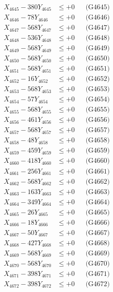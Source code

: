 \documentclass[a4paper,10pt]{article}
\begin{document}
{\begin{align}
X_{4645} - 380Y_{4645} &\leq +0 && \text{(G4645)} \\
X_{4646} - 78Y_{4646} &\leq +0 && \text{(G4646)} \\
X_{4647} - 568Y_{4647} &\leq +0 && \text{(G4647)} \\
X_{4648} - 536Y_{4648} &\leq +0 && \text{(G4648)} \\
X_{4649} - 568Y_{4649} &\leq +0 && \text{(G4649)} \\
X_{4650} - 568Y_{4650} &\leq +0 && \text{(G4650)} \\
\allowbreak
X_{4651} - 568Y_{4651} &\leq +0 && \text{(G4651)} \\
X_{4652} - 16Y_{4652} &\leq +0 && \text{(G4652)} \\
X_{4653} - 568Y_{4653} &\leq +0 && \text{(G4653)} \\
X_{4654} - 57Y_{4654} &\leq +0 && \text{(G4654)} \\
X_{4655} - 568Y_{4655} &\leq +0 && \text{(G4655)} \\
X_{4656} - 461Y_{4656} &\leq +0 && \text{(G4656)} \\
X_{4657} - 568Y_{4657} &\leq +0 && \text{(G4657)} \\
X_{4658} - 48Y_{4658} &\leq +0 && \text{(G4658)} \\
X_{4659} - 459Y_{4659} &\leq +0 && \text{(G4659)} \\
X_{4660} - 418Y_{4660} &\leq +0 && \text{(G4660)} \\
\allowbreak
X_{4661} - 256Y_{4661} &\leq +0 && \text{(G4661)} \\
X_{4662} - 568Y_{4662} &\leq +0 && \text{(G4662)} \\
X_{4663} - 163Y_{4663} &\leq +0 && \text{(G4663)} \\
X_{4664} - 349Y_{4664} &\leq +0 && \text{(G4664)} \\
X_{4665} - 26Y_{4665} &\leq +0 && \text{(G4665)} \\
X_{4666} - 18Y_{4666} &\leq +0 && \text{(G4666)} \\
X_{4667} - 50Y_{4667} &\leq +0 && \text{(G4667)} \\
X_{4668} - 427Y_{4668} &\leq +0 && \text{(G4668)} \\
X_{4669} - 568Y_{4669} &\leq +0 && \text{(G4669)} \\
X_{4670} - 568Y_{4670} &\leq +0 && \text{(G4670)} \\
\allowbreak
X_{4671} - 398Y_{4671} &\leq +0 && \text{(G4671)} \\
X_{4672} - 398Y_{4672} &\leq +0 && \text{(G4672)} \\

\end{align}}
\end{document}
